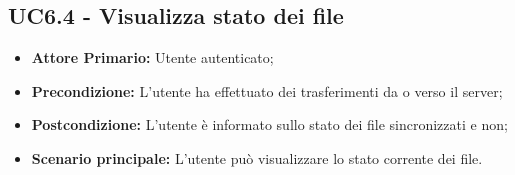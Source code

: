 \subsection{UC6.4 - Visualizza stato dei file}
\begin{itemize}
\item \textbf{Attore Primario:} Utente autenticato;
\item \textbf{Precondizione:} L'utente ha effettuato dei trasferimenti da o verso il server;
\item \textbf{Postcondizione:} L'utente è informato sullo stato dei file sincronizzati e non;
\item \textbf{Scenario principale:} L'utente può visualizzare lo stato corrente dei file.
\end{itemize}